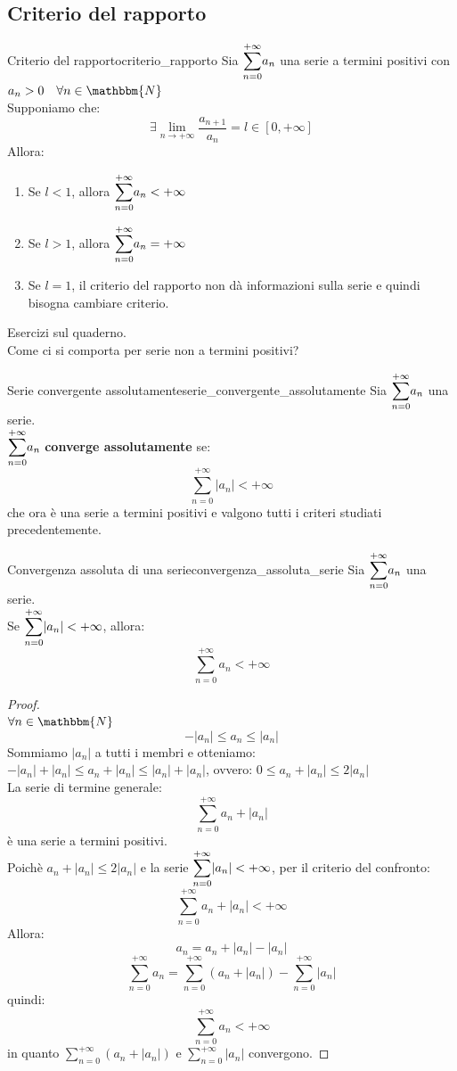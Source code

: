 \documentclass[12pt]{report}
\newcounter{theorem}
\newcounter{definition}
\newcommand{\nmu}{}
\begin{document}
		\subsection{Criterio del rapporto}
		\begin{theorem}{\nmu Criterio del rapporto}{criterio_rapporto}
			Sia $\mathlarger{\sum_{n=0}^{+\infty}}a_n$ una serie a termini positivi con $a_n > 0 \quad \forall n \in \mathbbm{N}$ \\
			Supponiamo che:
			\[
			\exists \lim_{n \to +\infty}\dfrac{a_{n+1}}{a_n} = l \in [0, +\infty]
			\]
			Allora:
			\begin{enumerate}[label=(\arabic*)]
				\item Se $l < 1$, allora $\mathlarger{\sum_{n=0}^{+\infty}}a_n < +\infty$
				\item Se $l > 1$, allora $\mathlarger{\sum_{n=0}^{+\infty}}a_n = +\infty$
				\item Se $l=1$, il criterio del rapporto non dà informazioni sulla serie e quindi bisogna cambiare criterio.
			\end{enumerate}
		\end{theorem}
		Esercizi sul quaderno. \\
		Come ci si comporta per serie non a termini positivi?
		\begin{definition}{\nmu Serie convergente assolutamente}{serie_convergente_assolutamente}
			Sia $\mathlarger{\sum_{n=0}^{+\infty}}a_n$ una serie. \\
			$\mathlarger{\sum_{n=0}^{+\infty}}a_n$ \textbf{converge assolutamente} se:
			\[
			\sum_{n=0}^{+\infty}|a_n| < +\infty
			\]
			che ora è una serie a termini positivi e valgono tutti i criteri studiati precedentemente.
		\end{definition}
		\begin{theorem}{\nmu Convergenza assoluta di una serie}{convergenza_assoluta_serie}
			Sia $\mathlarger{\sum_{n=0}^{+\infty}}a_n$ una serie. \\
			Se $\mathlarger{\sum_{n=0}^{+\infty}}|a_n| < +\infty$, allora:
			\[
			\sum_{n=0}^{+\infty}a_n < +\infty
			\]
			\begin{proof} \quad \\
				$\forall n \in \mathbbm{N}$ \[
				-|a_n| \leq a_n \leq |a_n|
				\]
				Sommiamo $|a_n|$ a tutti i membri e otteniamo: $-|a_n|+|a_n| \leq a_n + |a_n|\leq |a_n| + |a_n|$, ovvero: $0 \leq a_n+|a_n| \leq 2|a_n|$ \\
				La serie di termine generale:
				\[
				\sum_{n=0}^{+\infty}a_n+|a_n|
				\]
				è una serie a termini positivi. \\
				Poichè $a_n + |a_n| \leq 2|a_n|$ e la serie $\mathlarger{\sum_{n=0}^{+\infty}}|a_n| < +\infty$, per il criterio del confronto:
				\[
				\sum_{n=0}^{+\infty}a_n + |a_n| < +\infty
				\]
				Allora:
				\[
				a_n = a_n + |a_n| - |a_n|
				\]
				\[
				\sum_{n=0}^{+\infty}a_n = \sum_{n=0}^{+\infty}(a_n + |a_n|) -\sum_{n=0}^{+\infty}|a_n|
				\]
				quindi:
				\[
				\sum_{n=0}^{+\infty}a_n < +\infty
				\]
				in quanto $\sum_{n=0}^{+\infty}(a_n + |a_n|)$ e $\sum_{n=0}^{+\infty}|a_n|$ convergono.
			\end{proof}
		\end{theorem}
\end{document}
